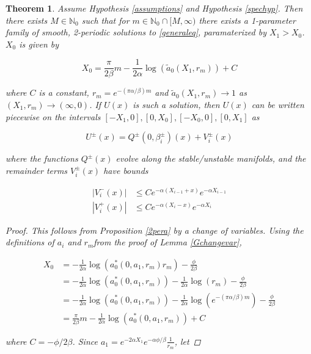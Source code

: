 \documentclass[12pt]{article}
\def\N{{\mathbb N}}
\newtheorem{theorem}{Theorem}
\begin{document}
\begin{theorem}\label{2pexistence}
Assume Hypothesis \ref{assumptions} and Hypothesis \ref{spechyp}. Then there exists $M \in \N_0$ such that for $m \in \N_0 \cap [M, \infty)$ there exists a 1-parameter family of smooth, 2-periodic solutions to \eqref{generaleq}, paramaterized by $X_1 > X_0$. $X_0$ is given by

\begin{equation}\label{X0}
X_0 = \frac{\pi}{2 \beta}m 
- \frac{1}{2 \alpha} \log(\tilde{a}_0(X_1, r_m)) + C
\end{equation}

where $C$ is a constant, $r_m = e^{-(\pi \alpha / \beta)m}$ and $\tilde{a}_0(X_1, r_m) \rightarrow 1$ as $(X_1, r_m) \rightarrow (\infty, 0)$. If $U(x)$ is such a solution, then $U(x)$ can be written piecewise on the intervals $[-X_1, 0], [0, X_0], [-X_0, 0], [0, X_1]$ as 

\begin{equation}
U^\pm(x) = Q^\pm(0, \beta_i^\pm)(x) + V_i^\pm(x)
\end{equation}

where the functions $Q^\pm(x)$ evolve along the stable/unstable manifolds, and the remainder terms $V_i^\pm(x)$ have bounds

\begin{align}
|V_i^-(x)| &\leq C e^{-\alpha(X_{i-1} + x)}e^{-\alpha X_{i-1}} \\
|V_i^+(x)| &\leq C e^{-\alpha(X_i - x)}e^{-\alpha X_i} 
\end{align} 

\begin{proof}
This follows from Proposition \ref{2pera} by a change of variables. Using the definitions of $a_i$ and $r_m$from the proof of Lemma \ref{Gchangevar},

\begin{align*}
X_0 &= -\frac{1}{2 \alpha} \log ( a_0^*(0, a_1, r_m) r_m) - \frac{\phi}{2 \beta} \\
&= -\frac{1}{2 \alpha} \log ( a_0^*(0, a_1, r_m))
- \frac{1}{2 \alpha} \log(r_m) - \frac{\phi}{2 \beta} \\
&= -\frac{1}{2 \alpha} \log ( a_0^*(0, a_1, r_m))
- \frac{1}{2 \alpha} \log \left( e^{-(\pi \alpha/\beta)m}\right) - \frac{\phi}{2 \beta} \\
&= \frac{\pi}{2 \beta} m - \frac{1}{2 \alpha} \log( a_0^*(0, a_1, r_m)) + C
\end{align*}

where $C = - \phi/2 \beta$. Since $a_1 = e^{-2\alpha X_1}e^{-\alpha \phi / \beta}\frac{1}{r_m}$, let


\end{proof}
\end{theorem}
\end{document}
